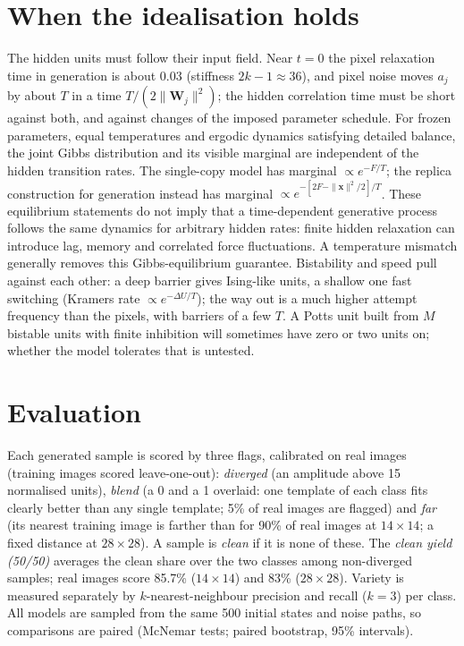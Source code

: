 \documentclass[11pt,a4paper]{article}
\newcommand{\vx}{\bm{x}}
\begin{document}
\section{When the idealisation holds}\label{sec:physical}
The hidden units must follow their input field. Near $t=0$ the pixel relaxation time in generation is about $0.03$
(stiffness $2k-1\approx36$), and pixel noise moves $a_j$ by about $T$ in a time $T/(2\|\bm W_j\|^2)$; the hidden
correlation time must be short against both, and against changes of the imposed parameter schedule. For frozen
parameters, equal temperatures and ergodic dynamics satisfying detailed balance, the joint Gibbs distribution
and its visible marginal are independent of the hidden transition rates. The single-copy model has marginal
$\propto e^{-F/T}$; the replica construction for generation instead has marginal
$\propto e^{-[2F-\|\vx\|^2/2]/T}$. These equilibrium statements do not imply that a time-dependent generative
process follows the same dynamics for arbitrary hidden rates: finite hidden relaxation can introduce lag,
memory and correlated force fluctuations. A temperature mismatch generally removes this Gibbs-equilibrium
guarantee. Bistability and speed pull against each other: a deep barrier gives Ising-like units, a shallow one
fast switching (Kramers rate $\propto e^{-\Delta U/T}$);
the way out is a much higher attempt frequency than the pixels, with barriers of a few $T$. A Potts unit built from
$M$ bistable units with finite inhibition will sometimes have zero or two units on; whether the model tolerates
that is untested.

\section{Evaluation}
Each generated sample is scored by three flags, calibrated on real images (training images scored
leave-one-out): \emph{diverged} (an amplitude above 15 normalised units), \emph{blend} (a 0 and a 1 overlaid: one
template of each class fits clearly better than any single template; 5\% of real images are flagged) and
\emph{far} (its nearest training image is farther than for 90\% of real images at $14\times14$; a fixed distance
at $28\times28$). A sample is \emph{clean} if it is none of these. The \emph{clean yield (50/50)} averages the clean
share over the two classes among non-diverged samples; real images score 85.7\% ($14\times14$) and 83\%
($28\times28$). Variety is measured separately by $k$-nearest-neighbour precision and recall ($k=3$) per class.
All models are sampled from the same 500 initial states and noise paths, so comparisons are paired (McNemar tests;
paired bootstrap, 95\% intervals).
\end{document}
